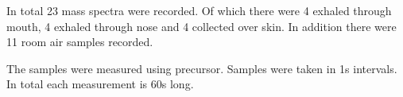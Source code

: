 In total 23 mass spectra were recorded.  Of which there were 4 exhaled
through mouth, 4 exhaled through nose and 4 collected over skin.  In
addition there were 11 room air samples recorded. 

The samples were measured using  precursor.  Samples were taken
in \si{1}{s} intervals.  In total each measurement is \si{60}{s} long.
